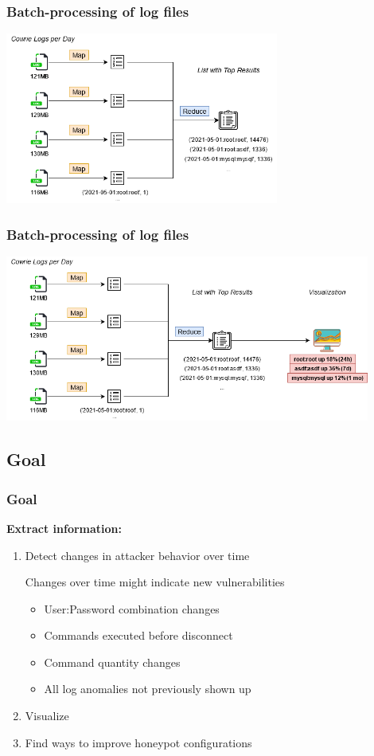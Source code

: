\documentclass[11pt,t,usepdftitle=false,aspectratio=169]{beamer}
\begin{document}
\begin{frame}[fragile]
	\frametitle{Batch-processing of log files}	
	\begin{center}
		\includegraphics[width=90mm]{_images/MapReduce-Visualization-03.png}
	\end{center}
\end{frame}

\begin{frame}[fragile]
	\frametitle{Batch-processing of log files}	
	\begin{center}
		\includegraphics[width=120mm]{_images/MapReduce-Visualization-04.png}
	\end{center}
\end{frame}


\subsection{Goal}
\begin{frame}
	\frametitle{Goal}
	\textbf{Extract information:}
	\begin{enumerate}
		\item Detect changes in attacker behavior over time		
		\begin{exampleblock}{Changes over time might indicate new vulnerabilities}
			\begin{itemize}
				\item User:Password combination changes
				\item Commands executed before disconnect 
				\item Command quantity changes
				\item All log anomalies not previously shown up
			\end{itemize}
		\end{exampleblock}
		\item Visualize 
		\item Find ways to improve honeypot configurations 
	\end{enumerate}
\end{frame}
\end{document}

